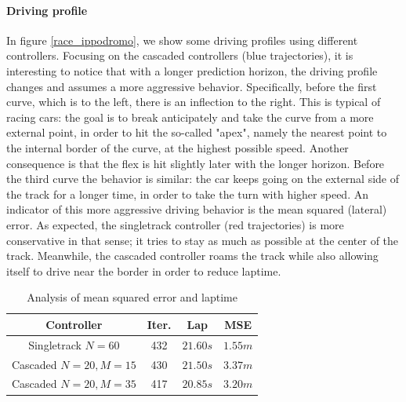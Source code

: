 \documentclass[a4paper, onecolumn, 12pt]{article}
\begin{document}
\paragraph{Driving profile}
In figure \ref{race_ippodromo}, we show some driving profiles using different
controllers. Focusing on the cascaded controllers (blue trajectories),
it is interesting to notice that with a longer prediction horizon, the driving
profile changes and assumes a more aggressive behavior. Specifically, before the
first curve, which is to the left, there is an inflection to the right. This is
typical of racing cars: the goal is to break anticipately and take the curve
from a more external point, in order to hit the so-called "apex", namely the
nearest point to the internal border of the curve, at the highest possible
speed. 
Another consequence is that the flex is hit slightly later with the longer horizon. 
Before the third curve the behavior is similar: the car keeps going on the external 
side of the track for a longer time, in order to take the turn with higher speed. 
An indicator of this more aggressive driving behavior is the mean squared (lateral)
error. As expected, the singletrack controller (red trajectories) is more conservative in that
sense; it tries to stay as much as possible at the center of the track.
Meanwhile, the cascaded controller roams the track while also allowing itself to
drive near the border in order to reduce laptime.
\begin{table}[H]
    \centering
    \caption{Analysis of mean squared error and laptime}
    \begin{tabular}{|c||c|c|c|}
        \hline
        \textbf{Controller} & \textbf{Iter.} & \textbf{Lap} & \textbf{MSE} \\ [0.5ex] 
        \hline
        \hline
        Singletrack $N=60$ & 432 & $21.60 s$ & $1.55 m$ \\
        \hline
        Cascaded $N=20, M=15$ & 430 & $21.50 s$ & $3.37 m$ \\
        \hline
        Cascaded $N=20, M=35$ & 417 & $20.85 s$ & $3.20 m$ \\
        \hline
    \end{tabular}
\end{table}
\end{document}
